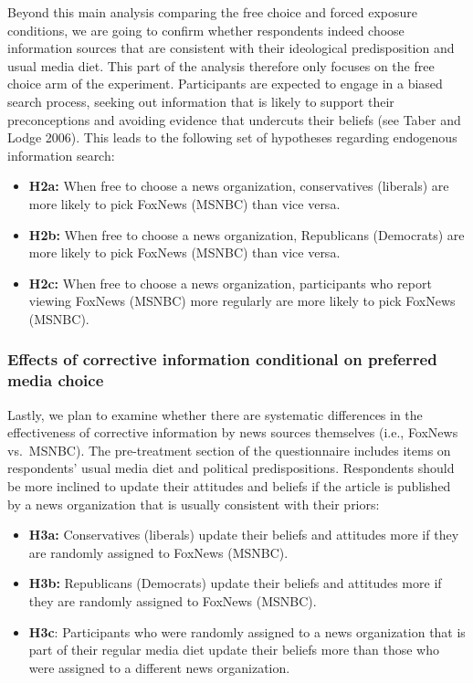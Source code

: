 \documentclass[]{article}
\providecommand{\tightlist}{%
  \setlength{\itemsep}{0pt}\setlength{\parskip}{0pt}}
\begin{document}
Beyond this main analysis comparing the free choice and forced exposure
conditions, we are going to confirm whether respondents indeed choose
information sources that are consistent with their ideological
predisposition and usual media diet. This part of the analysis therefore
only focuses on the free choice arm of the experiment. Participants are
expected to engage in a biased search process, seeking out information
that is likely to support their preconceptions and avoiding evidence
that undercuts their beliefs (see Taber and Lodge 2006). This leads to
the following set of hypotheses regarding endogenous information search:

\begin{itemize}
\tightlist
\item
  \textbf{H2a:} When free to choose a news organization, conservatives
  (liberals) are more likely to pick FoxNews (MSNBC) than vice versa.
\item
  \textbf{H2b:} When free to choose a news organization, Republicans
  (Democrats) are more likely to pick FoxNews (MSNBC) than vice versa.
\item
  \textbf{H2c:} When free to choose a news organization, participants
  who report viewing FoxNews (MSNBC) more regularly are more likely to
  pick FoxNews (MSNBC).
\end{itemize}

\hypertarget{effects-of-corrective-information-conditional-on-preferred-media-choice}{%
\subsubsection{Effects of corrective information conditional on
preferred media
choice}\label{effects-of-corrective-information-conditional-on-preferred-media-choice}}

Lastly, we plan to examine whether there are systematic differences in
the effectiveness of corrective information by news sources themselves
(i.e., FoxNews vs.~MSNBC). The pre-treatment section of the
questionnaire includes items on respondents' usual media diet and
political predispositions. Respondents should be more inclined to update
their attitudes and beliefs if the article is published by a news
organization that is usually consistent with their priors:

\begin{itemize}
\tightlist
\item
  \textbf{H3a:} Conservatives (liberals) update their beliefs and
  attitudes more if they are randomly assigned to FoxNews (MSNBC).
\item
  \textbf{H3b:} Republicans (Democrats) update their beliefs and
  attitudes more if they are randomly assigned to FoxNews (MSNBC).
\item
  \textbf{H3c}: Participants who were randomly assigned to a news
  organization that is part of their regular media diet update their
  beliefs more than those who were assigned to a different news
  organization.
\end{itemize}
\end{document}
